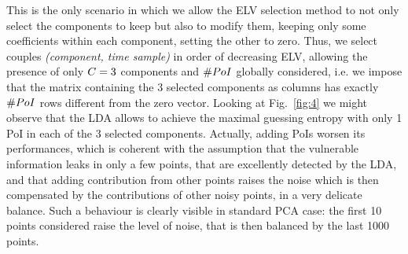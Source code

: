 This is the only scenario in which we allow the ELV selection method to not only select the components to keep but also to modify them, keeping only some coefficients within each component, setting the other to zero. Thus, we select couples \textit{(component, time sample)} in order of decreasing ELV, allowing the presence of only $C = 3$ components and $\# PoI$ globally considered, {i.e.} we impose that the matrix containing the 3 selected components as columns has exactly $\# PoI$ rows different from the zero vector. 
Looking at Fig.~\ref{fig:4} we might observe that the LDA allows to achieve the maximal guessing entropy with only 1 PoI in each of the 3 selected components. 
Actually, adding PoIs worsen its performances, which is coherent with the assumption that the vulnerable information leaks in only a few points, that are excellently detected by the LDA, and that adding contribution from other points raises the noise which is then compensated by the contributions of other noisy points, in a very delicate balance. Such a behaviour is clearly visible in standard PCA case: the first 10 points considered raise the level of noise, that is then balanced by the last 1000 points.

